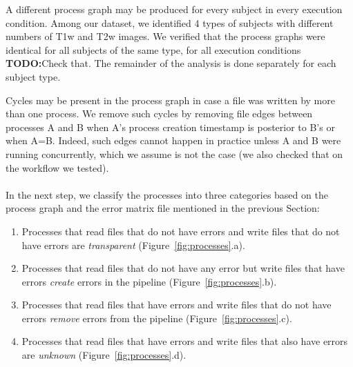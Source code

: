\documentclass{article}
\newcommand{\todo}[1]{\color{red}\textbf{TODO:}#1\color{black}}
\begin{document}
{A different process graph may be produced for every subject in every 
execution condition. Among our dataset, we identified 4 types of 
subjects with different numbers of T1w and T2w images. We verified that 
the process graphs were identical for all subjects of the same type, 
for all execution conditions \todo{Check that}. The remainder of the 
analysis is done separately for each subject type.

Cycles may be present in the process graph in case a file was written 
by more than one process. We remove such cycles by removing file edges 
between processes A and B when A's process creation timestamp is 
posterior to B's or when A=B. Indeed, such edges cannot happen in 
practice unless A and B were running concurrently, which we assume is 
not the case (we also checked that on the workflow we tested). 

\paragraph{} In the next step, we classify the processes into three 
categories based on the process graph and the error matrix file 
mentioned in the previous Section:
\begin{enumerate}
\item Processes that read files that do not have errors and write files that do not 
have errors are \emph{transparent} (Figure~\ref{fig:processes}.a).
\item Processes that read files 
that do not have any error but write files that have errors 
\emph{create} errors in the pipeline (Figure~\ref{fig:processes}.b).
\item Processes that read files 
that have errors and write files that do not have errors \emph{remove} 
errors from the pipeline (Figure~\ref{fig:processes}.c).
\item Processes that read files that have errors and write files that also have errors are 
\emph{unknown} (Figure~\ref{fig:processes}.d).
\end{enumerate}

}
\end{document}
